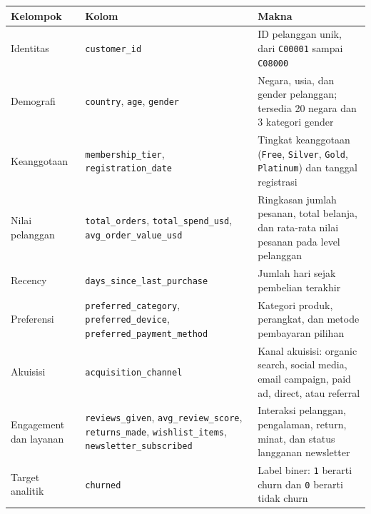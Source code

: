 \documentclass[
  indonesian,
  letterpaper,
  DIV=11,
  numbers=noendperiod]{scrreprt}
\newcounter{none} %
\begin{document}
{\def\LTcaptype{none} %
\begin{longtable}[]{@{}
  >{\raggedright\arraybackslash}p{}
  >{\raggedright\arraybackslash}p{}
  >{\raggedright\arraybackslash}p{}@{}}
\toprule\noalign{}
\begin{minipage}[b]{\linewidth}\raggedright
Kelompok
\end{minipage} & \begin{minipage}[b]{\linewidth}\raggedright
Kolom
\end{minipage} & \begin{minipage}[b]{\linewidth}\raggedright
Makna
\end{minipage} \\
\midrule\noalign{}
\endhead
\bottomrule\noalign{}
\endlastfoot
Identitas & \texttt{customer\_id} & ID pelanggan unik, dari
\texttt{C00001} sampai \texttt{C08000} \\
Demografi & \texttt{country}, \texttt{age}, \texttt{gender} & Negara,
usia, dan gender pelanggan; tersedia 20 negara dan 3 kategori gender \\
Keanggotaan & \texttt{membership\_tier}, \texttt{registration\_date} &
Tingkat keanggotaan (\texttt{Free}, \texttt{Silver}, \texttt{Gold},
\texttt{Platinum}) dan tanggal registrasi \\
Nilai pelanggan & \texttt{total\_orders}, \texttt{total\_spend\_usd},
\texttt{avg\_order\_value\_usd} & Ringkasan jumlah pesanan, total
belanja, dan rata-rata nilai pesanan pada level pelanggan \\
Recency & \texttt{days\_since\_last\_purchase} & Jumlah hari sejak
pembelian terakhir \\
Preferensi & \texttt{preferred\_category}, \texttt{preferred\_device},
\texttt{preferred\_payment\_method} & Kategori produk, perangkat, dan
metode pembayaran pilihan \\
Akuisisi & \texttt{acquisition\_channel} & Kanal akuisisi: organic
search, social media, email campaign, paid ad, direct, atau referral \\
Engagement dan layanan & \texttt{reviews\_given},
\texttt{avg\_review\_score}, \texttt{returns\_made},
\texttt{wishlist\_items}, \texttt{newsletter\_subscribed} & Interaksi
pelanggan, pengalaman, return, minat, dan status langganan newsletter \\
Target analitik & \texttt{churned} & Label biner: \texttt{1} berarti
churn dan \texttt{0} berarti tidak churn \\
\end{longtable}
}
\end{document}
